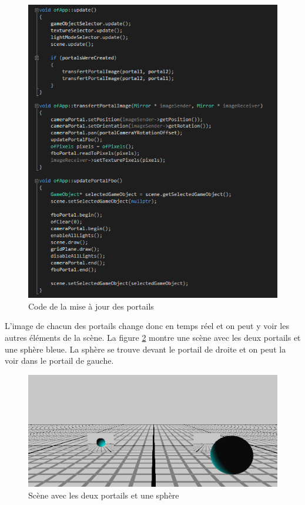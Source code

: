 \begin{figure}[H]
    \centering
	\includegraphics[scale=0.8]{fig/code_portals.png}
	\caption{Code de la mise à jour des portails}
	\label{fig:code_portals}
\end{figure}

L'image de chacun des portails change donc en temps réel et on peut y voir les autres éléments de la scène.
La figure \ref{fig:portals} montre une scène avec les deux portails et une sphère bleue.
La sphère se trouve devant le portail de droite et on peut la voir dans le portail de gauche.

\begin{figure}[H]
    \centering
	\includegraphics[scale=0.4]{fig/portals.png}
	\caption{Scène avec les deux portails et une sphère}
	\label{fig:portals}
\end{figure}


